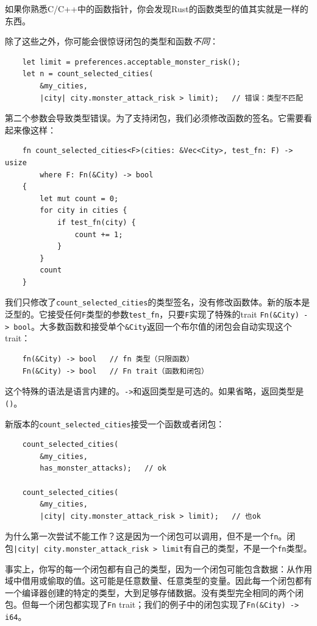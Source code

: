 如果你熟悉C/C++中的函数指针，你会发现Rust的函数类型的值其实就是一样的东西。

除了这些之外，你可能会很惊讶闭包的类型和函数\emph{不同}：
\begin{verbatim}
    let limit = preferences.acceptable_monster_risk();
    let n = count_selected_cities(
        &my_cities,
        |city| city.monster_attack_risk > limit);   // 错误：类型不匹配
\end{verbatim}

第二个参数会导致类型错误。为了支持闭包，我们必须修改函数的签名。它需要看起来像这样：
\begin{verbatim}
    fn count_selected_cities<F>(cities: &Vec<City>, test_fn: F) -> usize
        where F: Fn(&City) -> bool
    {
        let mut count = 0;
        for city in cities {
            if test_fn(city) {
                count += 1;
            }
        }
        count
    }
\end{verbatim}

我们只修改了\texttt{count\_selected\_cities}的类型签名，没有修改函数体。新的版本是泛型的。它接受任何\texttt{F}类型的参数\texttt{test\_fn}，只要\texttt{F}实现了特殊的trait \texttt{Fn(\&City) -> bool}。大多数函数和接受单个\texttt{\&City}返回一个布尔值的闭包会自动实现这个trait：
\begin{verbatim}
    fn(&City) -> bool   // fn 类型（只限函数）
    Fn(&City) -> bool   // Fn trait（函数和闭包）
\end{verbatim}

这个特殊的语法是语言内建的。\texttt{->}和返回类型是可选的。如果省略，返回类型是\texttt{()}。

新版本的\texttt{count\_selected\_cities}接受一个函数或者闭包：
\begin{verbatim}
    count_selected_cities(
        &my_cities,
        has_monster_attacks);   // ok

    count_selected_cities(
        &my_cities,
        |city| city.monster_attack_risk > limit);   // 也ok
\end{verbatim}

为什么第一次尝试不能工作？这是因为一个闭包可以调用，但不是一个\texttt{fn}。闭包\texttt{|city| city.monster\_attack\_risk > limit}有自己的类型，不是一个\texttt{fn}类型。

事实上，你写的每一个闭包都有自己的类型，因为一个闭包可能包含数据：从作用域中借用或偷取的值。这可能是任意数量、任意类型的变量。因此每一个闭包都有一个编译器创建的特定的类型，大到足够存储数据。没有类型完全相同的两个闭包。但每一个闭包都实现了\texttt{Fn} trait；我们的例子中的闭包实现了\texttt{Fn(\&City) -> i64}。

